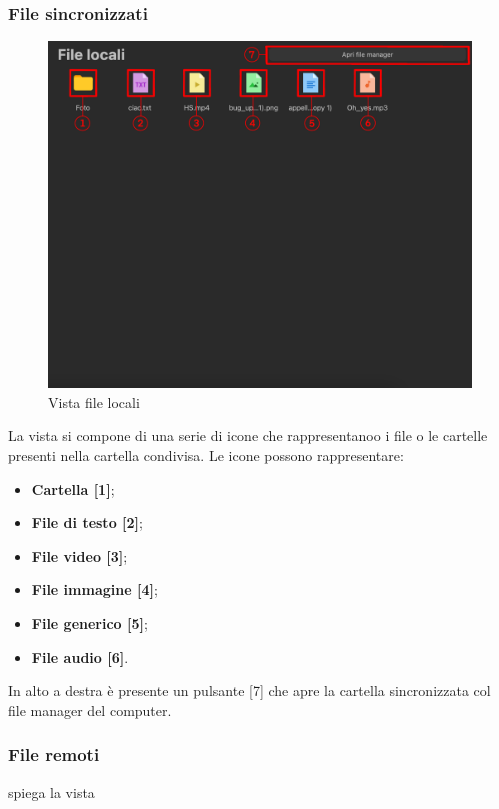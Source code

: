 \subsubsection{File sincronizzati}
\label{sec:fileSincronizzati}

\begin{figure}[H]
    \centering
    \includegraphics[scale = 0.7]{components/img/fileLocali.png}
    \caption{Vista file locali}
    \label{fig:fileSync}
\end{figure}

La vista si compone di una serie di icone che rappresentanoo i file o le cartelle presenti nella cartella condivisa. Le icone possono rappresentare:

\begin{itemize}
\item \textbf{Cartella [1]};\
\item \textbf{File di testo [2]};\
\item \textbf{File video [3]};\
\item \textbf{File immagine [4]};\
\item \textbf{File generico [5]};\
\item \textbf{File audio [6]}.\
\end{itemize}

In alto a destra è presente un pulsante [7] che apre la cartella sincronizzata col file manager del computer.



\subsubsection{File remoti}
\label{sec:fileRemoti}
spiega la vista

